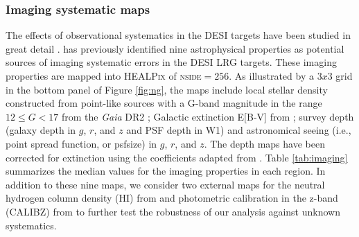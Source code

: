\subsubsection{Imaging systematic maps}
The effects of observational systematics in the DESI targets have been studied in great detail \cite[see, e.g.,][]{kitanidis2020imaging, zhou2021clustering, chaussidon2022angular}.  \cite{zhou2022target} has previously identified nine astrophysical properties as potential sources of imaging systematic errors in the DESI LRG targets. These imaging properties are mapped into \textsc{HEALPix} of \textsc{nside}$=256$. As illustrated by a $3x3$ grid in the bottom panel of Figure \ref{fig:ng}, the maps include local stellar density constructed from point-like sources with a G-band magnitude in the range $12 \leq G < 17$ from the \textit{Gaia} DR2 \citep[see,][]{gaiadr2, myers2022}; Galactic extinction E[B-V] from \cite{schlegel1998maps}; survey depth (galaxy depth in $g$, $r$, and $z$ and PSF depth in W1) and astronomical seeing (i.e., point spread function, or psfsize) in $g$, $r$, and $z$. The depth maps have been corrected for extinction using the coefficients adapted from \cite{2011ApJ...737..103S}. Table \ref{tab:imaging} summarizes the median values for the imaging properties in each region. In addition to these nine maps, we consider two external maps for the neutral hydrogen column density (HI) from \cite{2016A&A...594A.116H} and photometric calibration in the z-band (CALIBZ) from \cite{desi2023sv} to further test the robustness of our analysis against unknown systematics.

